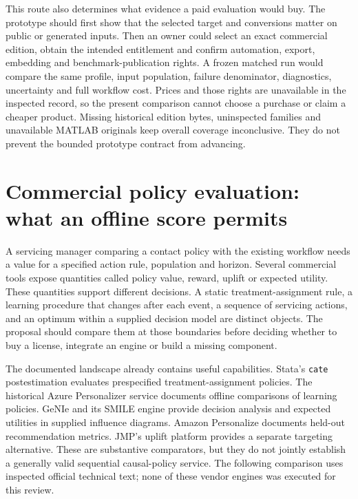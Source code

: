 This route also determines what evidence a paid evaluation would buy. The
prototype should first show that the selected target and conversions matter
on public or generated inputs. Then an owner could select an exact commercial
edition, obtain the intended entitlement and confirm automation, export,
embedding and benchmark-publication rights. A frozen matched run would compare
the same profile, input population, failure denominator, diagnostics,
uncertainty and full workflow cost. Prices and those rights are unavailable
in the inspected record, so the present comparison cannot choose a purchase
or claim a cheaper product. Missing historical edition bytes, uninspected
families and unavailable MATLAB originals keep overall coverage inconclusive.
They do not prevent the bounded prototype contract from advancing.
\citep{exec16_commercial_matrix}
\label{exec16:commercial-matrix-end}


\section{Commercial policy evaluation: what an offline score permits}
\label{exec16:commercial-policy}

A servicing manager comparing a contact policy with the existing workflow
needs a value for a specified action rule, population and horizon. Several
commercial tools expose quantities called policy value, reward, uplift or
expected utility. These quantities support different decisions. A static
treatment-assignment rule, a learning procedure that changes after each event,
a sequence of servicing actions, and an optimum within a supplied decision
model are distinct objects. The proposal should compare them at those
boundaries before deciding whether to buy a license, integrate an engine or
build a missing component.

The documented landscape already contains useful capabilities. Stata's
\texttt{cate} postestimation evaluates prespecified treatment-assignment
policies. The historical Azure Personalizer service documents offline
comparisons of learning policies. GeNIe and its SMILE engine provide decision
analysis and expected utilities in supplied influence diagrams. Amazon
Personalize documents held-out recommendation metrics. JMP's uplift platform
provides a separate targeting alternative. These are substantive comparators,
but they do not jointly establish a generally valid sequential causal-policy
service. The following comparison uses inspected official technical text;
none of these vendor engines was executed for this review.
\citep{exec13_ch_stata,exec16_cp_azure,exec16_cp_bayesfusion,exec16_cp_aws,exec13_ch_jmp_uplift}

